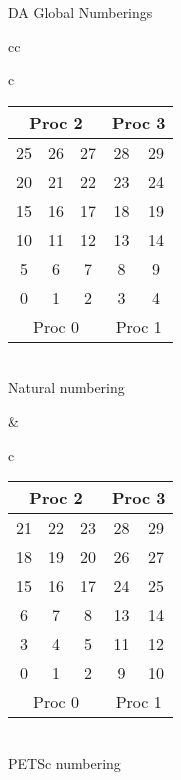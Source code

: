 \begin{frame}{DA Global Numberings}

\begin{center}
\begin{tabular}{cc}
\begin{tabular}{c}
\begin{tabular}{|ccc|cc|}
\hline
\multicolumn{3}{|c|}{Proc 2} & \multicolumn{2}{c|}{Proc 3} \\
\hline
25 & 26 & 27 & 28 & 29 \\
20 & 21 & 22 & 23 & 24 \\
15 & 16 & 17 & 18 & 19 \\
\hline
10 & 11 & 12 & 13 & 14 \\
 5 &  6 &  7 &  8 &  9 \\
 0 &  1 &  2 &  3 &  4 \\
\hline
\multicolumn{3}{|c|}{Proc 0} & \multicolumn{2}{c|}{Proc 1} \\
\hline
\end{tabular} \\
Natural numbering
\end{tabular}
& 
\begin{tabular}{c}
\begin{tabular}{|ccc|cc|}
\hline
\multicolumn{3}{|c|}{Proc 2} & \multicolumn{2}{c|}{Proc 3} \\
\hline
21 & 22 & 23 & 28 & 29 \\
18 & 19 & 20 & 26 & 27 \\
15 & 16 & 17 & 24 & 25 \\
\hline
 6 &  7 &  8 & 13 & 14 \\
 3 &  4 &  5 & 11 & 12 \\
 0 &  1 &  2 &  9 & 10 \\
\hline
\multicolumn{3}{|c|}{Proc 0} & \multicolumn{2}{c|}{Proc 1} \\
\hline
\end{tabular}\\
PETSc numbering
\end{tabular}
\end{tabular}
\end{center}
\end{frame}
